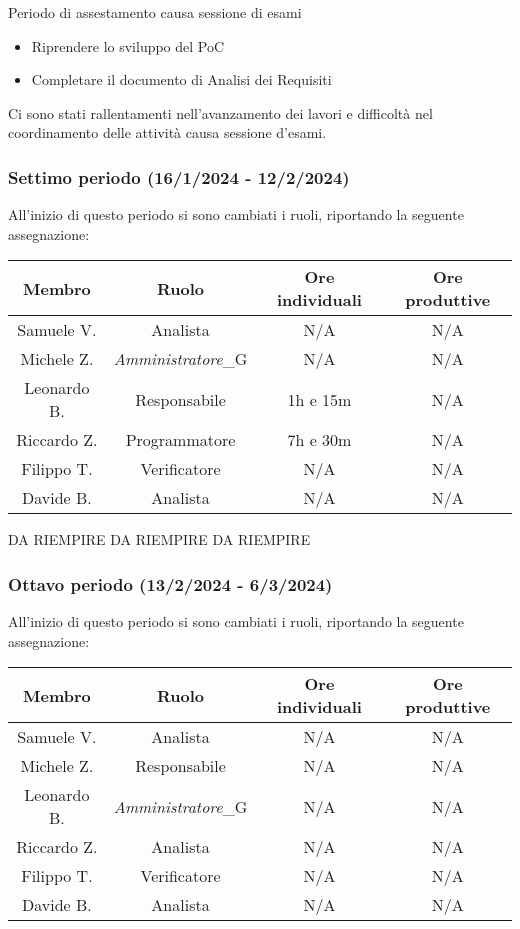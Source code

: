 Periodo di assestamento causa sessione di esami
\begin{itemize}
    \item Riprendere lo sviluppo del PoC
    \item Completare il documento di Analisi dei Requisiti
\end{itemize}
Ci sono stati rallentamenti nell'avanzamento dei lavori e difficoltà nel coordinamento delle attività causa sessione d'esami.


\subsubsection{Settimo periodo (16/1/2024 - 12/2/2024)}
All'inizio di questo periodo si sono cambiati i ruoli, riportando la seguente assegnazione:

\vspace{10 mm}
\begin{tabular}{|c|c|c|c|}
\hline
\textbf{Membro} & \textbf{Ruolo} & \textbf{Ore individuali} & \textbf{Ore produttive} \\
\hline
Samuele V. & Analista & N/A & N/A \\
\hline
Michele Z. & \textit{Amministratore}_G & N/A & N/A \\
\hline
Leonardo B. & Responsabile & 1h e 15m & N/A \\
\hline
Riccardo Z. & Programmatore & 7h e 30m & N/A \\
\hline
Filippo T. & Verificatore & N/A & N/A \\
\hline
Davide B. & Analista & N/A & N/A \\
\hline
\end{tabular}
\vspace{10 mm}

DA RIEMPIRE
DA RIEMPIRE
DA RIEMPIRE

\subsubsection{Ottavo periodo (13/2/2024 - 6/3/2024)}
All'inizio di questo periodo si sono cambiati i ruoli, riportando la seguente assegnazione:

\vspace{10 mm}
\begin{tabular}{|c|c|c|c|}
\hline
\textbf{Membro} & \textbf{Ruolo} & \textbf{Ore individuali} & \textbf{Ore produttive} \\
\hline
Samuele V. & Analista & N/A & N/A \\
\hline
Michele Z. & Responsabile & N/A & N/A \\
\hline
Leonardo B. & \textit{Amministratore}_G & N/A & N/A \\
\hline
Riccardo Z. & Analista & N/A & N/A \\
\hline
Filippo T. & Verificatore & N/A & N/A \\
\hline
Davide B. & Analista & N/A & N/A \\
\hline
\end{tabular}
\vspace{10 mm}

